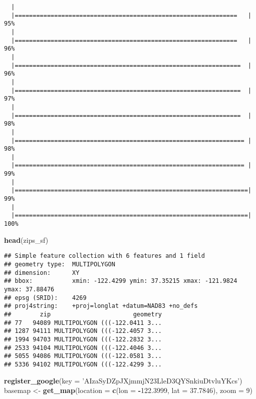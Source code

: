 \documentclass[]{article}
\newenvironment{Shaded}{\begin{snugshade}}{\end{snugshade}}
\newcommand{\KeywordTok}[1]{\textcolor[rgb]{0.13,0.29,0.53}{\textbf{#1}}}
\newcommand{\DataTypeTok}[1]{\textcolor[rgb]{0.13,0.29,0.53}{#1}}
\newcommand{\DecValTok}[1]{\textcolor[rgb]{0.00,0.00,0.81}{#1}}
\newcommand{\FloatTok}[1]{\textcolor[rgb]{0.00,0.00,0.81}{#1}}
\newcommand{\StringTok}[1]{\textcolor[rgb]{0.31,0.60,0.02}{#1}}
\newcommand{\OperatorTok}[1]{\textcolor[rgb]{0.81,0.36,0.00}{\textbf{#1}}}
\newcommand{\NormalTok}[1]{#1}
\begin{document}
\begin{verbatim}
  |                                                                       
  |==============================================================   |  95%
  |                                                                       
  |==============================================================   |  96%
  |                                                                       
  |===============================================================  |  96%
  |                                                                       
  |===============================================================  |  97%
  |                                                                       
  |===============================================================  |  98%
  |                                                                       
  |================================================================ |  98%
  |                                                                       
  |================================================================ |  99%
  |                                                                       
  |=================================================================|  99%
  |                                                                       
  |=================================================================| 100%
\end{verbatim}

\begin{Shaded}
\begin{Highlighting}[]
\KeywordTok{head}\NormalTok{(zips_sf)}
\end{Highlighting}
\end{Shaded}

\begin{verbatim}
## Simple feature collection with 6 features and 1 field
## geometry type:  MULTIPOLYGON
## dimension:      XY
## bbox:           xmin: -122.4299 ymin: 37.35215 xmax: -121.9824 ymax: 37.88476
## epsg (SRID):    4269
## proj4string:    +proj=longlat +datum=NAD83 +no_defs
##        zip                       geometry
## 77   94089 MULTIPOLYGON (((-122.0411 3...
## 1287 94111 MULTIPOLYGON (((-122.4057 3...
## 1994 94703 MULTIPOLYGON (((-122.2832 3...
## 2533 94104 MULTIPOLYGON (((-122.4046 3...
## 5055 94086 MULTIPOLYGON (((-122.0581 3...
## 5336 94102 MULTIPOLYGON (((-122.4299 3...
\end{verbatim}

\begin{Shaded}
\begin{Highlighting}[]
\KeywordTok{register_google}\NormalTok{(}\DataTypeTok{key =} \StringTok{'AIzaSyDZpJXjmmjN23LleD3QYSnkiuDtvluYKcs'}\NormalTok{)}
\NormalTok{basemap <-}\StringTok{ }\KeywordTok{get_map}\NormalTok{(}\DataTypeTok{location =} \KeywordTok{c}\NormalTok{(}\DataTypeTok{lon =} \OperatorTok{-}\FloatTok{122.3999}\NormalTok{, }\DataTypeTok{lat =} \FloatTok{37.7846}\NormalTok{), }\DataTypeTok{zoom =} \DecValTok{9}\NormalTok{)}
\end{Highlighting}
\end{Shaded}
\end{document}
